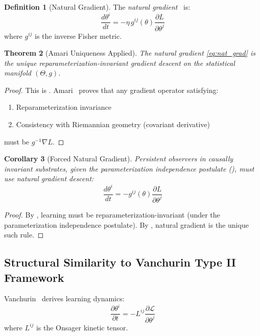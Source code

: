 \documentclass[11pt,a4paper]{article}
\theoremstyle{plain}
\newtheorem{theorem}{Theorem}[section]
\newtheorem{corollary}[theorem]{Corollary}
\theoremstyle{definition}
\newtheorem{definition}[theorem]{Definition}
\theoremstyle{remark}
\newcommand{\del}{\partial}
\newcommand{\grad}{\nabla}
\begin{document}
\begin{definition}[Natural Gradient]
The \emph{natural gradient}~\cite{amari1998natural} is:
\begin{equation}
\label{eq:nat_grad}
\frac{d\theta^i}{dt} = -\eta \, g^{ij}(\theta) \frac{\del L}{\del \theta^j}
\end{equation}
where $g^{ij}$ is the inverse Fisher metric.
\end{definition}

\begin{theorem}[Amari Uniqueness Applied]
\label{thm:amari_applied}
The natural gradient \eqref{eq:nat_grad} is the \emph{unique} reparameterization-invariant gradient descent on the statistical manifold $(\Theta, g)$.
\end{theorem}
\begin{proof}
This is . Amari~\cite{amari1998natural} proves that any gradient operator satisfying:
\begin{enumerate}[noitemsep]
\item Reparameterization invariance
\item Consistency with Riemannian geometry (covariant derivative)
\end{enumerate}
must be $g^{-1} \grad L$.
\end{proof}

\begin{corollary}[Forced Natural Gradient]
\label{cor:forced_nat_grad}
Persistent observers in causally invariant substrates, given the parameterization independence postulate (), must use natural gradient descent:
\begin{equation}
\frac{d\theta^i}{dt} = -g^{ij}(\theta) \frac{\del L}{\del \theta^j}
\end{equation}
\end{corollary}
\begin{proof}
By , learning must be reparameterization-invariant (under the parameterization independence postulate). By , natural gradient is the unique such rule.
\end{proof}

\subsection{Structural Similarity to Vanchurin Type II Framework}

Vanchurin~\cite{vanchurin2025covariant} derives learning dynamics:
\begin{equation}
\label{eq:vanchurin}
\frac{\del \theta^i}{\del t} = -L^{ij} \frac{\del \mathcal{L}}{\del \theta^j}
\end{equation}
where $L^{ij}$ is the Onsager kinetic tensor.
\end{document}
